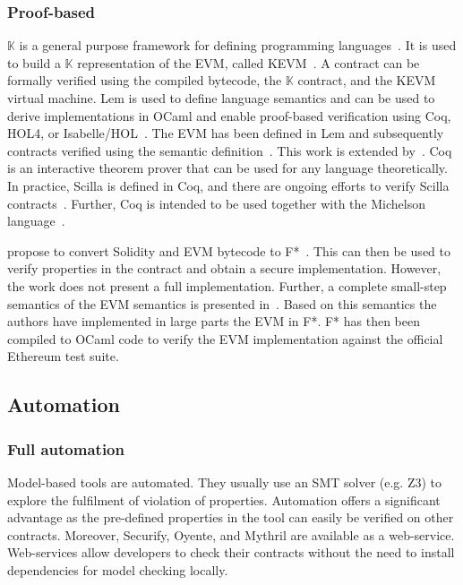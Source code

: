 \subsubsection{Proof-based}
$\mathbb{K}$ is a general purpose framework for defining programming languages~\cite{Rosu2007}. It is used to build a $\mathbb{K}$ representation of the EVM, called KEVM~\cite{Hildenbrandt2017}. 
A contract can be formally verified using the compiled bytecode, the $\mathbb{K}$ contract, and the KEVM virtual machine. 
Lem is used to define language semantics and can be used to derive implementations in OCaml and enable proof-based verification using Coq, HOL4, or Isabelle/HOL~\cite{Mulligan2014}. The EVM has been defined in Lem and subsequently contracts verified using the semantic definition~\cite{Hirai2017}. This work is extended by~\cite{Amani2018}. 
Coq is an interactive theorem prover that can be used for any language theoretically. In practice, Scilla is defined in Coq, and there are ongoing efforts to verify Scilla contracts~\cite{Sergey2018}. Further, Coq is intended to be used together with the Michelson language~\cite{DynamicLedgerSolutions2017}.

\citeauthor{Bhargavan2016} propose to convert Solidity and EVM bytecode to F*~\cite{Bhargavan2016}. This can then be used to verify properties in the contract and obtain a secure implementation. However, the work does not present a full implementation.
Further, a complete small-step semantics of the EVM semantics is presented in~\cite{Grishchenko2018}. Based on this semantics the authors have implemented in large parts the EVM in F*. F* has then been compiled to OCaml code to verify the EVM implementation against the official Ethereum test suite.

\subsection{Automation} 
\subsubsection{Full automation}
Model-based tools are automated. They usually use an SMT solver (e.g. Z3) to explore the fulfilment of violation of properties. Automation offers a significant advantage as the pre-defined properties in the tool can easily be verified on other contracts. Moreover, Securify, Oyente, and Mythril are available as a web-service. Web-services allow developers to check their contracts without the need to install dependencies for model checking locally.

